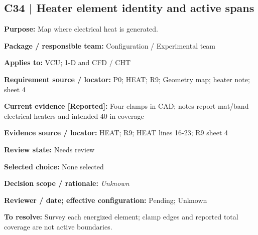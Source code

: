 \documentclass[11pt]{article}
\begin{document}
\begin{minipage}{\textwidth}\small\setlength{\parskip}{2pt}
\subsection*{C34 | Heater element identity and active spans}
\textbf{Purpose:} Map where electrical heat is generated.\par
\textbf{Package / responsible team:} Configuration / Experimental team\par
\textbf{Applies to:} VCU; 1-D and CFD / CHT\par
\textbf{Requirement source / locator:} P0; HEAT; R9; Geometry map; heater note; sheet 4\par
\textbf{Current evidence [Reported]:} Four clamps in CAD; notes report mat/band electrical heaters and intended 40-in coverage\par
\textbf{Evidence source / locator:} HEAT; R9; HEAT lines 16-23; R9 sheet 4\par
\textbf{Review state:} Needs review\par
\textbf{Selected choice:} None selected\par
\textbf{Decision scope / rationale:} \textit{Unknown}\par
\textbf{Reviewer / date; effective configuration:} Pending; Unknown\par
\textbf{To resolve:} Survey each energized element; clamp edges and reported total coverage are not active boundaries.\par
\end{minipage}\par\vspace{5pt}
\end{document}
